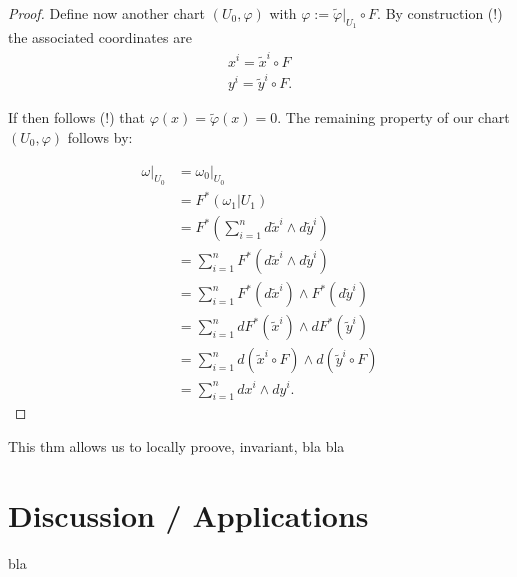 \begin{proof}
Define now another chart $(U_0,\varphi)$ with $\varphi := \tilde{\varphi}|_{U_1} \circ  F$. By construction (!) the associated coordinates are
\begin{align*}
x^i = \tilde{x}^i \circ F \\
y^i = \tilde{y}^i \circ F.
\end{align*}

If then follows (!) that $\varphi(x) = \tilde{\varphi}(x) = 0$. The remaining property of our chart $(U_0,\varphi)$ follows by:

\begin{align*}
\omega|_{U_0} &= \omega_0|_{U_0} \\
&= F^* (\omega_1|{U_1}) \\
&= F^* \left( \sum^n_{i=1} d\tilde{x}^i \wedge d\tilde{y}^i \right) \\
&= \sum^n_{i=1} F^* (d\tilde{x}^i \wedge d\tilde{y}^i) \\
&= \sum^n_{i=1} F^*(d\tilde{x}^i) \wedge F^*(d\tilde{y}^i) \\
&= \sum^n_{i=1} d F^*(\tilde{x}^i) \wedge d F^*(\tilde{y}^i) \\
&= \sum^n_{i=1} d (\tilde{x}^i \circ F) \wedge d ( \tilde{y}^i \circ F) \\
&= \sum^n_{i=1} dx^i \wedge dy^i.
\end{align*}






\end{proof}

\begin{remark}
This thm allows us to locally proove, invariant, bla bla
\end{remark}

\section{Discussion / Applications}

bla

